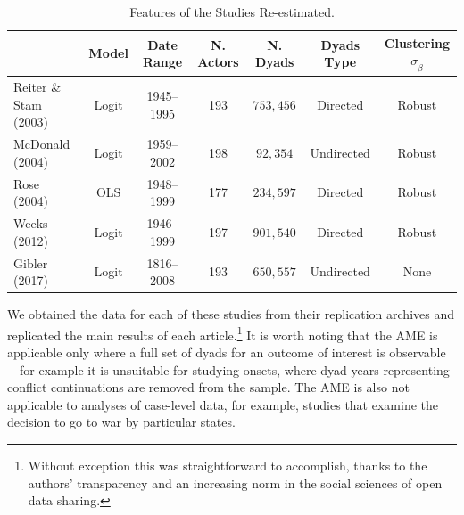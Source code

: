 
\begin{table}
\caption{Features of the Studies Re-estimated.}
	\begin{tabular}{lcccccc}
		& Model &  Date Range & N. Actors  & N. Dyads & Dyads Type & Clustering $\sigma_{\hat{\beta}}$ \\ \toprule
		Reiter \& Stam (2003) &Logit &1945--1995 &  193 & $753,456$ & Directed & Robust \\	
		McDonald (2004) & Logit &1959--2002 & 198 & $92,354$ & Undirected & Robust\\
		Rose (2004) & OLS & 1948--1999 & 177 & $234,597$ & Directed & Robust \\	 
		Weeks (2012) & Logit & 1946--1999 &197 &  $901,540$ & Directed & Robust \\
		Gibler (2017) & Logit & 1816--2008 &193 &   $650,557$ & Undirected & None \\ \bottomrule
	\end{tabular}
\end{table}

We obtained the data for each of these studies from their replication archives and replicated the main results of each article.\footnote{Without exception this was straightforward to accomplish, thanks to the authors' transparency  and an increasing norm in the social sciences of open data sharing.}  It is worth noting that the AME is applicable only where a full set of dyads for an outcome of interest is observable---for example it is unsuitable for studying onsets, where dyad-years representing conflict continuations are removed from the sample. The AME is also not applicable to analyses of case-level data, for example, studies that examine the decision to go to war by particular states.

